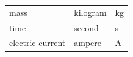 {\begin{tabular}[t]{|l|l|l|}
        mass &
    
    
        kilogram &
    
    
        kg%
     \tabularnewline\cline{1-1}\cline{2-2}\cline{3-3}
    
    
        time &
    
    
        second &
    
    
        s%
     \tabularnewline\cline{1-1}\cline{2-2}\cline{3-3}
    
    
        electric current &
    
    
        ampere &
    
    
        A%
     \tabularnewline\cline{1-1}\cline{2-2}\cline{3-3}
    

\end{tabular}}
